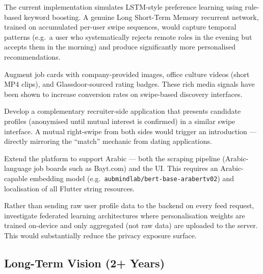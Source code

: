 \documentclass[12pt, a4paper, oneside]{report}
\begin{document}
\begin{description}[leftmargin=2cm, style=nextline, itemsep=8pt]
  \item[True LSTM Behavioural Modelling]
        The current implementation simulates LSTM-style preference learning using rule-based
        keyword boosting. A genuine Long Short-Term Memory recurrent network, trained on
        accumulated per-user swipe sequences, would capture temporal patterns (e.g.\ a user
        who systematically rejects remote roles in the evening but accepts them in the
        morning) and produce significantly more personalised recommendations.

  \item[Multi-Modal Job Cards]
        Augment job cards with company-provided images, office culture videos (short MP4
        clips), and Glassdoor-sourced rating badges. These rich media signals have been shown
        to increase conversion rates on swipe-based discovery interfaces.

  \item[Recruiter Matching Mode]
        Develop a complementary recruiter-side application that presents candidate profiles
        (anonymised until mutual interest is confirmed) in a similar swipe interface. A
        mutual right-swipe from both sides would trigger an introduction — directly mirroring
        the ``match'' mechanic from dating applications.

  \item[Multi-Language Support]
        Extend the platform to support Arabic — both the scraping pipeline (Arabic-language
        job boards such as Bayt.com) and the UI. This requires an Arabic-capable embedding
        model (e.g.\ \texttt{aubmindlab/bert-base-arabertv02}) and localisation of all
        Flutter string resources.

  \item[Federated Learning for Privacy-Preserving Personalisation]
        Rather than sending raw user profile data to the backend on every feed request,
        investigate federated learning architectures where personalisation weights are trained
        on-device and only aggregated (not raw data) are uploaded to the server. This would
        substantially reduce the privacy exposure surface.
\end{description}

\subsection{Long-Term Vision (2+ Years)}
\label{sec:future-long}
\end{document}
